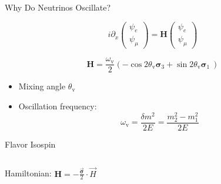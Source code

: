 \documentclass[9pt]{beamer}
\begin{document}
\begin{darkframes}
\begin{frame}[fragile]{Why Do Neutrinos Oscillate?}
\begin{tcolorbox}[title=Equation of Motion, standard jigsaw, opacityback=0, coltext=white]

\begin{equation*}
i\partial_x \begin{pmatrix}
\psi_e\\
\psi_\mu
\end{pmatrix} = \mathbf{H}\begin{pmatrix}
\psi_e\\
\psi_\mu
\end{pmatrix}
\end{equation*}

\end{tcolorbox}

\pause

\begin{tcolorbox}[standard jigsaw, opacityback=0,coltext=white]
\begin{equation*}
\mathbf{H} = \frac{\omega_{\mathrm v} }{2}\left( - \cos 2\theta_{\mathrm v } \boldsymbol{\sigma}_3  + \sin 2\theta_{\mathrm{v}} \boldsymbol{\sigma}_1\ \right)
\end{equation*}


\begin{itemize}
   \item  Mixing angle $\theta_{\mathrm v}$
    \item  Oscillation frequency:
\begin{equation*}
    \omega_{\mathrm v} = \frac{\delta m^2}{2E}=\frac{m_2^2 - m_1^2}{2E}
\end{equation*}

\end{itemize}


\end{tcolorbox}






\end{frame}



\begin{frame}{Flavor Isospin}








\begin{columns}[T]
\begin{column}{0.5\textwidth}


Hamiltonian: $\mathbf H = - \frac{\vec{\boldsymbol{\sigma}} }{2}\cdot \vec H$



\end{column}
\end{columns}
\end{frame}
\end{darkframes}
\end{document}
